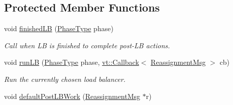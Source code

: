 \subsection*{Protected Member Functions}
\begin{DoxyCompactItemize}
\item 
void \hyperlink{structvt_1_1vrt_1_1collection_1_1balance_1_1_l_b_manager_a7b5455f6e85bb16453971e49ab6450fa}{finished\+LB} (\hyperlink{namespacevt_a46ce6733d5cdbd735d561b7b4029f6d7}{Phase\+Type} phase)
\begin{DoxyCompactList}\small\item\em Call when LB is finished to complete post-\/\+LB actions. \end{DoxyCompactList}\item 
void \hyperlink{structvt_1_1vrt_1_1collection_1_1balance_1_1_l_b_manager_a1c94e2b100562775d0663d10f5b557d9}{run\+LB} (\hyperlink{namespacevt_a46ce6733d5cdbd735d561b7b4029f6d7}{Phase\+Type} phase, \hyperlink{namespacevt_a36db99df4c973d48b1118a293fff533f}{vt\+::\+Callback}$<$ \hyperlink{structvt_1_1vrt_1_1collection_1_1balance_1_1_reassignment_msg}{Reassignment\+Msg} $>$ cb)
\begin{DoxyCompactList}\small\item\em Run the currently chosen load balancer. \end{DoxyCompactList}\item 
void \hyperlink{structvt_1_1vrt_1_1collection_1_1balance_1_1_l_b_manager_a702179841dc5bb5f730bf81a74092ae2}{default\+Post\+L\+B\+Work} (\hyperlink{structvt_1_1vrt_1_1collection_1_1balance_1_1_reassignment_msg}{Reassignment\+Msg} $\ast$r)
\end{DoxyCompactItemize}
